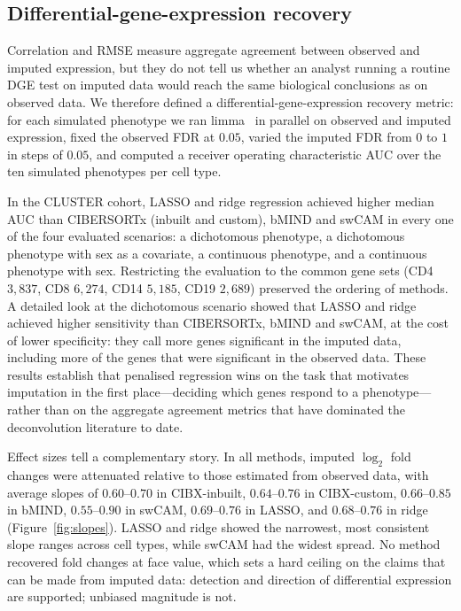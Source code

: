 \documentclass[11pt]{article}
\begin{document}
\subsection{Differential-gene-expression recovery}

Correlation and RMSE measure aggregate agreement between observed and
imputed expression, but they do not tell us whether an analyst running
a routine DGE test on imputed data would reach the same biological
conclusions as on observed data. We therefore defined a
differential-gene-expression recovery metric: for each simulated
phenotype we ran limma~\citep{ritchie2015limma} in parallel on observed
and imputed expression, fixed the observed FDR at $0.05$, varied the
imputed FDR from $0$ to $1$ in steps of $0.05$, and computed a receiver
operating characteristic AUC over the ten simulated phenotypes per
cell type.

In the CLUSTER cohort, LASSO and ridge regression achieved higher
median AUC than CIBERSORTx (inbuilt and custom), bMIND and swCAM in
every one of the four evaluated scenarios: a dichotomous phenotype, a
dichotomous phenotype with sex as a covariate, a continuous phenotype,
and a continuous phenotype with sex. Restricting the evaluation to the
common gene sets (CD4 $3{,}837$, CD8 $6{,}274$, CD14 $5{,}185$, CD19
$2{,}689$) preserved the ordering of methods. A detailed look at the
dichotomous scenario showed that LASSO and ridge achieved higher
sensitivity than CIBERSORTx, bMIND and swCAM, at the cost of lower
specificity: they call more genes significant in the imputed data,
including more of the genes that were significant in the observed
data. These results establish that penalised regression wins on the
task that motivates imputation in the first place---deciding which
genes respond to a phenotype---rather than on the aggregate agreement
metrics that have dominated the deconvolution literature to date.

Effect sizes tell a complementary story. In all methods, imputed
$\log_{2}$ fold changes were attenuated relative to those estimated
from observed data, with average slopes of $0.60$--$0.70$ in
CIBX-inbuilt, $0.64$--$0.76$ in CIBX-custom, $0.66$--$0.85$ in bMIND,
$0.55$--$0.90$ in swCAM, $0.69$--$0.76$ in LASSO, and $0.68$--$0.76$ in
ridge (Figure~\ref{fig:slopes}). LASSO and ridge showed the narrowest,
most consistent slope ranges across cell types, while swCAM had the
widest spread. No method recovered fold changes at face value, which
sets a hard ceiling on the claims that can be made from imputed data:
detection and direction of differential expression are supported;
unbiased magnitude is not.
\end{document}
